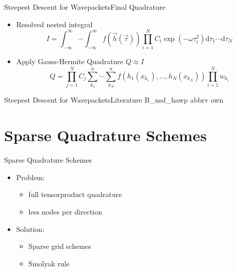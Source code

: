 \documentclass{beamer}
\begin{document}
\begin{frame}{Steepest Descent for Wavepackets}{Final Quadrature}
  \begin{itemize}
    \item Resolved nested integral
    \begin{equation*}
      I = \int_{-\infty}^\infty \cdots \int_{-\infty}^\infty
          f\left(\vec{h}(\vec{\tau})\right)
          \prod_{i=1}^N C_i
                        \exp\left(-\omega \tau_i^2\right)
          \mathrm{d}\tau_1 \cdots \mathrm{d}\tau_N
    \end{equation*}
    \item Apply Gauss-Hermite Quadrature $Q \approx I$
    \begin{equation*}
      Q =
      \prod_{j=1}^N C_j
      \sum_{k_1}^n \cdots \sum_{k_N}^n
      f\left(h_1\left(x_{k_1}\right),
           \ldots,
           h_N\left(x_{k_N}\right)
    \right)
    \prod_{i=1}^N w_{k_i}
    \end{equation*}
  \end{itemize}
\end{frame}


\begin{frame}{Steepest Descent for Wavepackets}{Literature}
  \nocite{sdwp}{B_nsd_hawp}
  \scriptsize
  {abbrv}
  {own}{}
\end{frame}


\section{Sparse Quadrature Schemes}


\begin{frame}{Sparse Quadrature Schemes}
  \begin{itemize}
  \item Problem:
    \begin{itemize}
    \item full tensorproduct quadrature
    \item less nodes per direction
    \end{itemize}
  \end{itemize}
  \vspace{0.2cm}
  \begin{itemize}
  \item Solution:
    \begin{itemize}
    \item Sparse grid schemes
    \item Smolyak rule
    \end{itemize}
  \end{itemize}
\end{frame}
\end{document}
